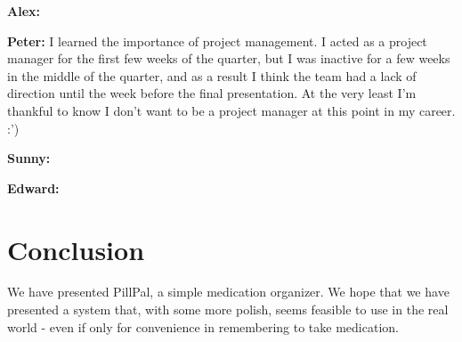 \documentclass[sigconf]{acmart}
\begin{document}
\textbf{Alex:}

\textbf{Peter:} I learned the importance of project management. I acted as a project manager for the first few weeks of the quarter, but I was inactive for a few weeks in the middle of the quarter, and as a result I think the team had a lack of direction until the week before the final presentation. At the very least I'm thankful to know I don't want to be a project manager at this point in my career. :')

\textbf{Sunny:} 

\textbf{Edward:}

\section{Conclusion}
We have presented PillPal, a simple medication organizer. We hope that we have presented a system that, with some more polish, seems feasible to use in the real world - even if only for convenience in remembering to take medication.



\end{document}

